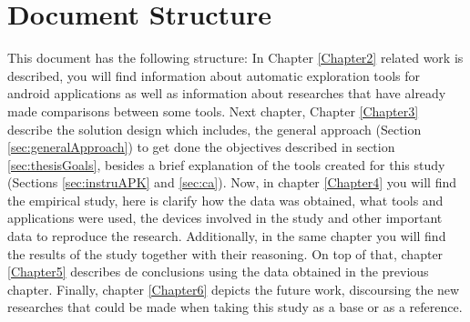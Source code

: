 \section{Document Structure}

This document has the following structure: In Chapter \ref{Chapter2} related work is described, you will find information about automatic exploration tools for android applications as well as information about researches that have already made comparisons between some tools. Next chapter, Chapter \ref{Chapter3} describe the solution design which includes, the general approach (Section \ref{sec:generalApproach}) to get done the objectives described in section \ref{sec:thesisGoals}, besides a brief explanation of the tools created for this study (Sections \ref{sec:instruAPK} and \ref{sec:ca}). Now, in chapter \ref{Chapter4} you will find the empirical study, here is clarify how the data was obtained, what tools and applications were used, the devices involved in the study and other important data to reproduce the research. Additionally, in the same chapter you will find the results of the study together with their reasoning. On top of that, chapter \ref{Chapter5} describes de conclusions using the data obtained in the previous chapter. Finally, chapter \ref{Chapter6} depicts the future work, discoursing the new researches that could be made when taking this study as a base or as a reference.
